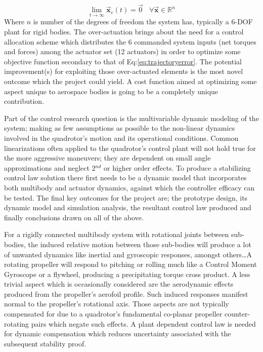 \begin{equation} \label{eq:trajectoryerror}
\lim_{t \rightarrow \infty} \vec{\mathbf{x}}_e(t) = \vec{0}~~~~\forall \vec{\mathbf{x}} \in \mathbb{R}^n
\end{equation}
Where $n$ is number of the degrees of freedom the system has, typically a 6-DOF plant for rigid bodies. The over-actuation brings about the need for a control allocation scheme which distributes the 6 commanded system inputs (net torques and forces) among the actuator set (12 actuators) in order to optimize some objective function secondary to that of Eq:\ref{eq:trajectoryerror}. The potential improvement(s) for exploiting those over-actuated elements is the most novel outcome which the project could yield. A cost function aimed at optimizing some aspect unique to aerospace bodies is going to be a completely unique contribution.
\par
Part of the control research question is the multivariable dynamic modeling of the system; making as few assumptions as possible to the non-linear dynamics involved in the quadrotor's motion and its operational conditions. Common linearizations often applied to the quadrotor's control plant will not hold true for the more aggressive maneuvers; they are dependent on small angle approximations and neglect 2$^{nd}$ or higher order effects. To produce a stabilizing control law solution there first needs to be a dynamic model that incorporates both multibody and actuator dynamics, against which the controller efficacy can be tested. The final key outcomes for the project are; the prototype design, its  dynamic model and simulation analysis, the resultant control law produced and finally conclusions drawn on all of the above.
\par
For a rigidly connected multibody system with rotational joints between sub-bodies, the induced relative motion between those sub-bodies will produce a lot of unwanted dynamics like inertial and gyroscopic responses, amongst others\ldots A rotating propeller will respond to pitching or rolling much like a Control Moment Gyroscope \cite{cmg} or a flywheel, producing a precipitating torque cross product. A less trivial aspect which is occasionally considered are the aerodynamic effects produced from the propeller's aerofoil profile. Such induced responses manifest normal to the propeller's rotational axis. Those aspects are not typically compensated for due to a quadrotor's fundamental co-planar propeller counter-rotating pairs which negate such effects. A plant dependent control law is needed for dynamic compensation which reduces uncertainty associated with the subsequent stability proof. 
